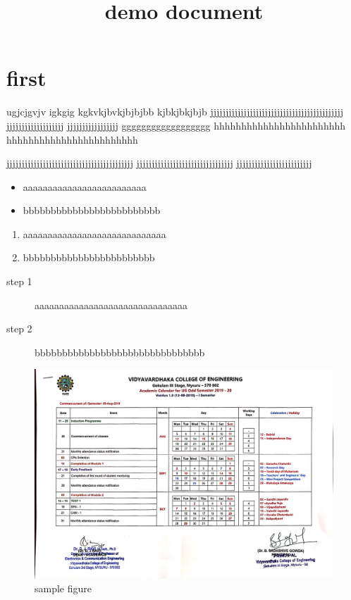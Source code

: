\documentclass[journal] {article}
\begin{document}
\title{demo document}
\maketitle

\section{first}

ugjcjgvjv igkgig
kgkvkjbvkjbjbjbb kjbkjbkjbjb jjjjjjjjjjjjjjjjjjjjjjjjjjjjjjjjjjjjjjjjjjjj jjjjjjjjjjjjjjjjjjj jjjjjjjjjjjjjjjjj
gggggggggggggggggg hhhhhhhhhhhhhhhhhhhhhhhh hhhhhhhhhhhhhhhhhhhhhhhh

jjjjjjjjjjjjjjjjjjjjjjjjjjjjjjjjjjjjjjjjjj jjjjjjjjjjjjjjjjjjjjjjjjjjjjjjjj jjjjjjjjjjjjjjjjjjjjjjjjj


\begin{itemize}
	\item aaaaaaaaaaaaaaaaaaaaaaaaa
	\item bbbbbbbbbbbbbbbbbbbbbbbbb
\end{itemize}



\begin{enumerate}
	\item aaaaaaaaaaaaaaaaaaaaaaaaaaaaa
	\item bbbbbbbbbbbbbbbbbbbbbbbb
\end{enumerate}




\begin{description}
	\item[step 1] aaaaaaaaaaaaaaaaaaaaaaaaaaaaaaa
	\item [step 2] bbbbbbbbbbbbbbbbbbbbbbbbbbbbbbb
\end{description}




\begin{figure}[htbp]
	\centering
		\includegraphics{CoE-1st Sem-Page1.jpg}
	\caption{sample figure}
	\label{fig:CoE-1st Sem-Page1}
\end{figure}
\end{document}
